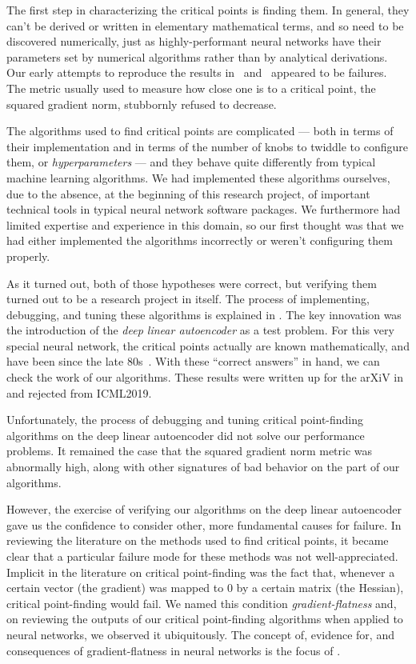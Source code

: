 \documentclass[../../thesis.tex]{subfiles}
\begin{document}
The first step in characterizing the critical points is finding them.
In general, they can't be derived or written in elementary mathematical terms,
and so need to be discovered numerically,
just as highly-performant neural networks have their parameters set
by numerical algorithms rather than by analytical derivations.
Our early attempts to reproduce the results
in~\cite{dauphin2014} and~\cite{pennington2017}
appeared to be failures.
The metric usually used to measure how close one is
to a critical point, the squared gradient norm,
stubbornly refused to decrease.

The algorithms used to find critical points are complicated ---
both in terms of their implementation and in terms of the number of knobs
to twiddle to configure them, or \emph{hyperparameters} ---
and they behave quite differently from typical machine learning algorithms.
We had implemented these algorithms ourselves,
due to the absence, at the beginning of this research project,
of important technical tools in typical neural network software packages.
We furthermore had limited expertise and experience in this domain,
so our first thought was that we had either implemented the algorithms incorrectly
or weren't configuring them properly.

As it turned out, both of those hypotheses were correct,
but verifying them turned out to be a research project in itself.
The process of implementing, debugging, and tuning these algorithms
is explained in .
The key innovation was the introduction of the \emph{deep linear autoencoder}
as a test problem.
For this very special neural network,
the critical points actually are known mathematically,
and have been since the late 80s~\cite{baldi1989}.
With these \enquote{correct answers} in hand,
we can check the work of our algorithms.
These results were written up for the arXiV
in~\cite{frye2019}
and rejected from ICML2019.

Unfortunately, the process of debugging and tuning critical point-finding
algorithms on the deep linear autoencoder did not solve
our performance problems.
It remained the case that the squared gradient norm metric was abnormally high,
along with other signatures of bad behavior on the part of our algorithms.

However, the exercise of verifying our algorithms on the deep linear autoencoder
gave us the confidence to consider other, more fundamental causes for failure.
In reviewing the literature on the methods used to find critical points,
it became clear that a particular failure mode for these methods
was not well-appreciated.
Implicit in the literature on critical point-finding was the fact that,
whenever a certain vector (the gradient)
was mapped to 0 by a certain matrix (the Hessian),
critical point-finding would fail.
We named this condition \emph{gradient-flatness}
and, on reviewing the outputs of our critical point-finding algorithms
when applied to neural networks,
we observed it ubiquitously.
The concept of, evidence for, and consequences of gradient-flatness
in neural networks is the focus of .
\end{document}
